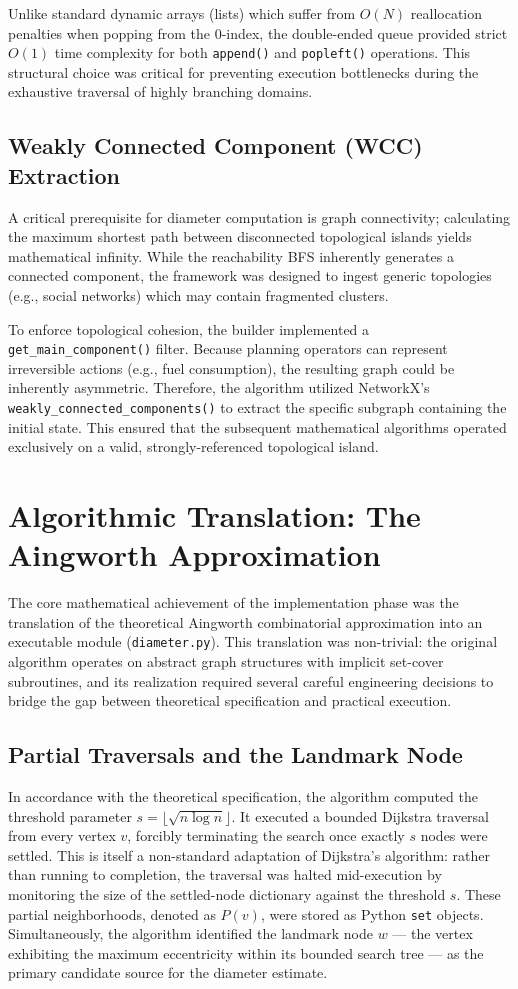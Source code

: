 Unlike standard dynamic arrays (lists) which suffer from $O(N)$ reallocation penalties when popping from the 0-index, the double-ended queue provided strict $O(1)$ time complexity for both \texttt{append()} and \texttt{popleft()} operations. This structural choice was critical for preventing execution bottlenecks during the exhaustive traversal of highly branching domains.

\subsection{Weakly Connected Component (WCC) Extraction}
A critical prerequisite for diameter computation is graph connectivity; calculating the maximum shortest path between disconnected topological islands yields mathematical infinity. While the reachability BFS inherently generates a connected component, the framework was designed to ingest generic topologies (e.g., social networks) which may contain fragmented clusters.

To enforce topological cohesion, the builder implemented a \texttt{get\_main\_component()} filter. Because planning operators can represent irreversible actions (e.g., fuel consumption), the resulting graph could be inherently asymmetric. Therefore, the algorithm utilized NetworkX's \texttt{weakly\_connected\_components()} to extract the specific subgraph containing the initial state. This ensured that the subsequent mathematical algorithms operated exclusively on a valid, strongly-referenced topological island.

\section{Algorithmic Translation: The Aingworth Approximation}
The core mathematical achievement of the implementation phase was the translation of the theoretical Aingworth combinatorial approximation into an executable module (\texttt{diameter.py}). This translation was non-trivial: the original algorithm operates on abstract graph structures with implicit set-cover subroutines, and its realization required several careful engineering decisions to bridge the gap between theoretical specification and practical execution.

\subsection{Partial Traversals and the Landmark Node}
In accordance with the theoretical specification, the algorithm computed the threshold parameter $s = \lfloor\sqrt{n \log n}\rfloor$. It executed a bounded Dijkstra traversal from every vertex $v$, forcibly terminating the search once exactly $s$ nodes were settled. This is itself a non-standard adaptation of Dijkstra's algorithm: rather than running to completion, the traversal was halted mid-execution by monitoring the size of the settled-node dictionary against the threshold $s$. These partial neighborhoods, denoted as $P(v)$, were stored as Python \texttt{set} objects. Simultaneously, the algorithm identified the landmark node $w$ — the vertex exhibiting the maximum eccentricity within its bounded search tree — as the primary candidate source for the diameter estimate.
 
